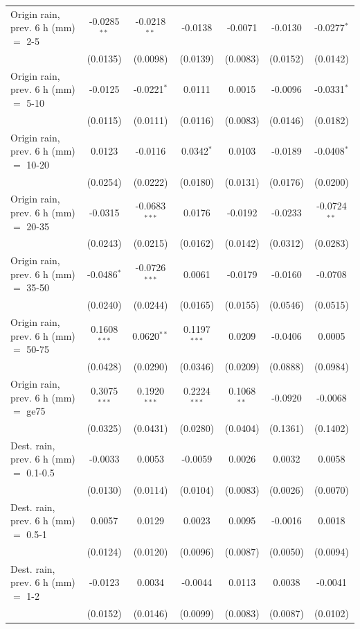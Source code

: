 \begin{tabular}{lcccccc}
   Origin rain, prev. 6 h (mm) $=$ 2-5 & -0.0285$^{**}$ & -0.0218$^{**}$ & -0.0138 & -0.0071 & -0.0130 & -0.0277$^{*}$\\
    & (0.0135) & (0.0098) & (0.0139) & (0.0083) & (0.0152) & (0.0142)\\
   Origin rain, prev. 6 h (mm) $=$ 5-10 & -0.0125 & -0.0221$^{*}$ & 0.0111 & 0.0015 & -0.0096 & -0.0331$^{*}$\\
    & (0.0115) & (0.0111) & (0.0116) & (0.0083) & (0.0146) & (0.0182)\\
   Origin rain, prev. 6 h (mm) $=$ 10-20 & 0.0123 & -0.0116 & 0.0342$^{*}$ & 0.0103 & -0.0189 & -0.0408$^{*}$\\
    & (0.0254) & (0.0222) & (0.0180) & (0.0131) & (0.0176) & (0.0200)\\
   Origin rain, prev. 6 h (mm) $=$ 20-35 & -0.0315 & -0.0683$^{***}$ & 0.0176 & -0.0192 & -0.0233 & -0.0724$^{**}$\\
    & (0.0243) & (0.0215) & (0.0162) & (0.0142) & (0.0312) & (0.0283)\\
   Origin rain, prev. 6 h (mm) $=$ 35-50 & -0.0486$^{*}$ & -0.0726$^{***}$ & 0.0061 & -0.0179 & -0.0160 & -0.0708\\
    & (0.0240) & (0.0244) & (0.0165) & (0.0155) & (0.0546) & (0.0515)\\
   Origin rain, prev. 6 h (mm) $=$ 50-75 & 0.1608$^{***}$ & 0.0620$^{**}$ & 0.1197$^{***}$ & 0.0209 & -0.0406 & 0.0005\\
    & (0.0428) & (0.0290) & (0.0346) & (0.0209) & (0.0888) & (0.0984)\\
   Origin rain, prev. 6 h (mm) $=$ ge75 & 0.3075$^{***}$ & 0.1920$^{***}$ & 0.2224$^{***}$ & 0.1068$^{**}$ & -0.0920 & -0.0068\\
    & (0.0325) & (0.0431) & (0.0280) & (0.0404) & (0.1361) & (0.1402)\\
   Dest. rain, prev. 6 h (mm) $=$ 0.1-0.5 & -0.0033 & 0.0053 & -0.0059 & 0.0026 & 0.0032 & 0.0058\\
    & (0.0130) & (0.0114) & (0.0104) & (0.0083) & (0.0026) & (0.0070)\\
   Dest. rain, prev. 6 h (mm) $=$ 0.5-1 & 0.0057 & 0.0129 & 0.0023 & 0.0095 & -0.0016 & 0.0018\\
    & (0.0124) & (0.0120) & (0.0096) & (0.0087) & (0.0050) & (0.0094)\\
   Dest. rain, prev. 6 h (mm) $=$ 1-2 & -0.0123 & 0.0034 & -0.0044 & 0.0113 & 0.0038 & -0.0041\\
    & (0.0152) & (0.0146) & (0.0099) & (0.0083) & (0.0087) & (0.0102)\\

\end{tabular}
